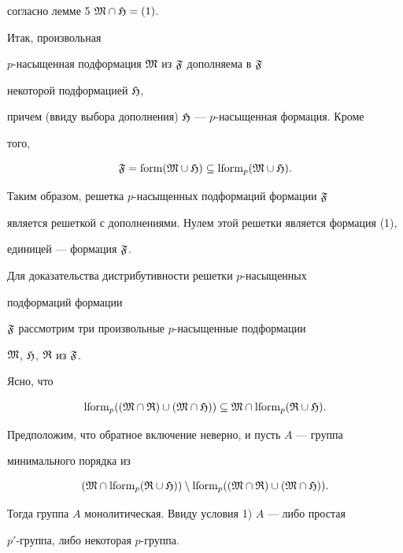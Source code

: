 \begin{pf}
согласно лемме 5 $\frak M\cap\frak H=(1)$. 


Итак, произвольная 


$p$-насыщенная подформация $\frak M$ из $\frak F$ дополняема в $\frak F$ 


некоторой подформацией $\frak H$, 


причем (ввиду выбора дополнения) $\frak H$ --- $p$-насыщенная формация. Кроме 


того, 


$$ 


\frak F=\form(\frak M\cup\frak H) \subseteq \lform_p(\frak M\cup\frak H). 


$$ 


Таким образом, решетка $p$-насыщенных подформаций формации $\frak F$ 


является решеткой с дополнениями. Нулем этой решетки является формация (1), 


единицей --- формация $\frak F$. 


 


Для доказательства дистрибутивности решетки $p$-насыщенных 


подформаций формации 


$\frak F$ рассмотрим три произвольные $p$-насыщенные подформации 


$\frak M$, $\frak H$, $\frak R$ из $\frak F$. 


 


Ясно, что 


$$ 


\lform_p((\frak M\cap\frak R)\cup(\frak M\cap\frak H)) 


\subseteq\frak M\cap\lform_p(\frak R\cup\frak H). 


$$ 


Предположим, что обратное включение неверно, и пусть $A$ --- группа 


минимального порядка из 


$$ 


(\frak M\cap\lform_p(\frak R\cup\frak H))\setminus 


\lform_p((\frak M\cap\frak R)\cup(\frak M\cap\frak H)). 


$$ 


Тогда группа $A$ монолитическая. Ввиду условия 1) $A$ --- либо простая 


$p'$-группа, либо некоторая $p$-группа. 


 



\end{pf}
